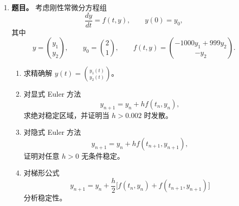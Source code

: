 ﻿\documentclass[UTF8,12pt]{ctexart}
\begin{document}
\begin{enumerate}[label=\textbf{\arabic*.},leftmargin=2.2em]
\textbf{解答。} 记
\[
\tau=\Delta t,\qquad h=\Delta x,\qquad r=\frac{\tau}{h^2}.
\]
格式可写成
\[
\bigl((1+\theta\tau)I-\theta\tau\delta_{xx}\bigr)U^{m+1}
=\bigl((1-(1-\theta)\tau)I+(1-\theta)\tau\delta_{xx}\bigr)U^m.
\]
右端逐点为
\[
\bigl(1-(1-\theta)\tau-2(1-\theta)r\bigr)U_j^m
+(1-\theta)r(U_{j+1}^m+U_{j-1}^m).
\]
若
\[
1-(1-\theta)\tau-2(1-\theta)r\ge0,
\]
即
\[
(1-\theta)\tau\left(1+\frac2{h^2}\right)\le1,
\]
也就是
\[
(1-\theta)\tau\le\frac{h^2}{h^2+2},
\]
则右端系数非负，且系数和为 \(1-(1-\theta)\tau\)。因此
\[
\left\|\bigl((1-(1-\theta)\tau)I+(1-\theta)\tau\delta_{xx}\bigr)U^m\right\|_{\ell^\infty}
\le(1-(1-\theta)\tau)\|U^m\|_{\ell^\infty}.
\]
另一方面，算子
\[
(1+\theta\tau)I-\theta\tau\delta_{xx}
\]
是对角占优的 \(M\)-矩阵，其逆在 \(\ell^\infty\) 范数下满足
\[
\left\|\bigl((1+\theta\tau)I-\theta\tau\delta_{xx}\bigr)^{-1}\right\|_{\infty}
\le\frac1{1+\theta\tau}.
\]
于是
\[
\|U^{m+1}\|_{\ell^\infty}
\le
\frac{1-(1-\theta)\tau}{1+\theta\tau}
\|U^m\|_{\ell^\infty}.
\]
迭代即得题中估计，并且
\[
\boxed{A(\theta)=1-\theta.}
\]

对 \(\ell^2\) 稳定性作 Fourier 分析。令
\[
U_j^m=\xi^m e^{ij\eta}.
\]
因为
\[
\delta_{xx}e^{ij\eta}
=-\frac4{h^2}\sin^2\frac{\eta}{2}\,e^{ij\eta},
\]
记
\[
s=\sin^2\frac{\eta}{2}\in[0,1].
\]
放大因子为
\[
\xi(\eta)=
\frac{1-(1-\theta)\tau-4(1-\theta)rs}
{1+\theta\tau+4\theta rs}.
\]
分母恒正。显然分子不超过分母，所以只需控制
\[
1-(1-\theta)\tau-4(1-\theta)rs
\ge
-\bigl(1+\theta\tau+4\theta rs\bigr).
\]
这等价于
\[
2+(2\theta-1)\tau+4(2\theta-1)rs\ge0.
\]
若 \(\theta\ge1/2\)，该不等式自动成立，所以 \(|\xi(\eta)|\le1\) 对所有 \(\eta\) 成立，因而无条件 \(\ell^2\) 稳定。

若 \(0\le\theta<1/2\)，上式等价于
\[
2-(1-2\theta)\tau-4(1-2\theta)rs\ge0.
\]
最坏情形为 \(s=1\)，故需要
\[
(1-2\theta)\tau\left(1+\frac4{h^2}\right)\le2,
\]
即
\[
(1-2\theta)\tau\le\frac{2h^2}{h^2+4}.
\]
因此
\[
\boxed{B(\theta)=1-2\theta.}
\]

\item \textbf{题目。} 考虑刚性常微分方程组
\[
\frac{dy}{dt}=f(t,y),\qquad y(0)=y_0,
\]
其中
\[
y=\binom{y_1}{y_2},\qquad
y_0=\binom21,\qquad
f(t,y)=\binom{-1000y_1+999y_2}{-y_2}.
\]
\begin{enumerate}[label=(\alph*),leftmargin=2.0em]
\item 求精确解 \(y(t)=\binom{y_1(t)}{y_2(t)}\)。
\item 对显式 Euler 方法
\[
y_{n+1}=y_n+hf(t_n,y_n),
\]
求绝对稳定区域，并证明当 \(h>0.002\) 时发散。
\item 对隐式 Euler 方法
\[
y_{n+1}=y_n+hf(t_{n+1},y_{n+1}),
\]
证明对任意 \(h>0\) 无条件稳定。
\item 对梯形公式
\[
y_{n+1}=y_n+\frac h2\bigl[f(t_n,y_n)+f(t_{n+1},y_{n+1})\bigr]
\]
分析稳定性。
\end{enumerate}


\end{enumerate}
\end{document}
